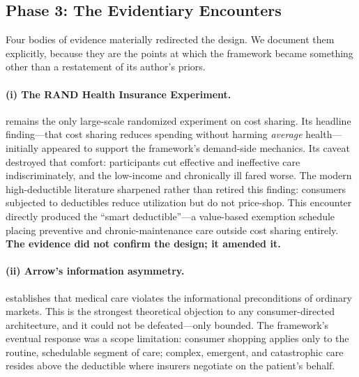 \documentclass[11pt,a4paper]{article}
\begin{document}
\subsection{Phase 3: The Evidentiary Encounters}

Four bodies of evidence materially redirected the design. We document them explicitly, because they are the points at which the framework became something other than a restatement of its author's priors.

\paragraph{(i) The RAND Health Insurance Experiment.} \citet{newhouse1993} remains the only large-scale randomized experiment on cost sharing. Its headline finding---that cost sharing reduces spending without harming \emph{average} health---initially appeared to support the framework's demand-side mechanics. Its caveat destroyed that comfort: participants cut effective and ineffective care indiscriminately, and the low-income and chronically ill fared worse. The modern high-deductible literature \citep{brotgoldberg2017} sharpened rather than retired this finding: consumers subjected to deductibles reduce utilization but do not price-shop. This encounter directly produced the ``smart deductible''---a value-based exemption schedule \citep{chernew2007} placing preventive and chronic-maintenance care outside cost sharing entirely. \textbf{The evidence did not confirm the design; it amended it.}

\paragraph{(ii) Arrow's information asymmetry.} \citet{arrow1963} establishes that medical care violates the informational preconditions of ordinary markets. This is the strongest theoretical objection to any consumer-directed architecture, and it could not be defeated---only bounded. The framework's eventual response was a scope limitation: consumer shopping applies only to the routine, schedulable segment of care; complex, emergent, and catastrophic care resides above the deductible where insurers negotiate on the patient's behalf.
\end{document}
